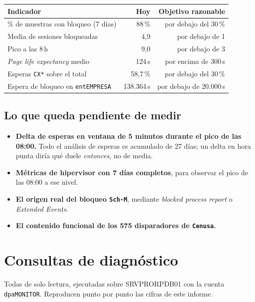 \documentclass[11pt,a4paper]{article}
\newcommand{\cod}[1]{\texttt{\small #1}}
\begin{document}
\begin{table}[h]
\centering
\small
\begin{tabular}{lrr}
\toprule
\textbf{Indicador} & \textbf{Hoy} & \textbf{Objetivo razonable} \\
\midrule
\% de muestras con bloqueo (7 días) & 88\,\% & por debajo del 30\,\% \\
Media de sesiones bloqueadas        & 4,9    & por debajo de 1 \\
Pico a las 8\,h                     & 9,0    & por debajo de 3 \\
\emph{Page life expectancy} medio   & 124\,s & por encima de 300\,s \\
Esperas \cod{CX*} sobre el total    & 58,7\,\% & por debajo del 30\,\% \\
Espera de bloqueo en \cod{entEMPRESA} & 138.364\,s & por debajo de 20.000\,s \\
\bottomrule
\end{tabular}
\end{table}

\subsection{Lo que queda pendiente de medir}

\begin{itemize}[leftmargin=1.4em]\itemsep3pt
  \item \textbf{Delta de esperas en ventana de 5 minutos durante el pico de
        las 08:00.} Todo el análisis de esperas es acumulado de 27 días; un
        delta en hora punta diría qué duele \emph{entonces}, no de media.
  \item \textbf{Métricas de hipervisor con 7 días completos}, para observar
        el pico de las 08:00 a ese nivel.
  \item \textbf{El origen real del bloqueo \cod{Sch-M}}, mediante
        \emph{blocked process report} o \emph{Extended Events}.
  \item \textbf{El contenido funcional de los 575 disparadores de
        \cod{Cenusa}.}
\end{itemize}

\newpage
\section{Consultas de diagnóstico}

Todas de solo lectura, ejecutadas sobre SRVPRORPDB01 con la cuenta
\cod{dpaMONITOR}. Reproducen punto por punto las cifras de este informe.
\end{document}
